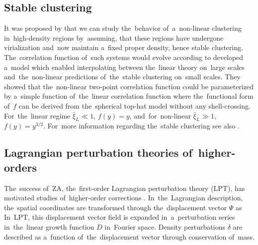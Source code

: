 \subsection{Stable clustering}
It was proposed by \textcite{1974ApJ...189L..51P} that we can study the~behavior of~a~non-linear clustering in~high-density regions by~assuming, that these regions have undergone virialization and~now maintain a~fixed proper density, hence stable clustering. The~correlation function of~such systems would evolve according to
\textcite{1991ApJ...374L...1H} developed a~model which enabled interpolating between the~linear theory on~large scales and~the~non-linear predictions of~the~stable clustering on~small scales. They showed that the~non-linear two-point correlation function could be parameterized by a~simple function of~the~linear correlation function
where the~functional form of~$f$ can be derived from the~spherical top-hat model without any shell-crossing. For~the~linear regime $\bar\xi_{L}\ll1$, $f(y)=y$, and~for~non-linear $\bar\xi_{L}\gg1$, $f(y)=y^{3/2}$. For~more information regarding the~stable clustering see  also \textcite{1996MNRAS.280L..19P,2003MNRAS.341.1311S}.
\subsection{Lagrangian perturbation theories of~higher-orders}
The~success of~ZA, the~first-order Lagrangian perturbation theory (LPT), has motivated studies of~higher-order corrections \parencite[see e.g.][]{10.1093/mnras/264.2.375,2002PhR...367....1B,2010MNRAS.403.1859J,2014ApJ...788...63S}. In~the~Lagrangian description, the~spatial coordinates are transformed through the~displacement vector $\Psi$ as
In~LPT, this displacement vector field is expanded in~a~perturbation series in~the~linear growth function $D$ in~Fourier space. Density perturbations $\delta$ are described as a~function of~the~displacement vector through conservation of~mass.
